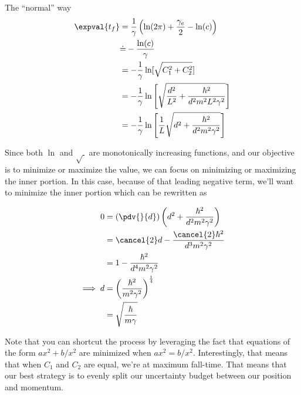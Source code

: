 \begin{answer}
\begin{answerpart}{The ``normal'' way}
    \begin{equation}
      \begin{split}
        \expval{t_f}
        &=
        \frac{1}{\gamma}
        \left(
        \ln(2\pi)
        +
        \frac{\gamma_e}{2}
        -
        \ln(c)
        \right)
        \\
        &\dot{=}
        -\frac{\ln(c)}{\gamma}
        \\
        &=
        -\frac{1}{\gamma}
        \ln[\sqrt{C_1^2 + C_2^2}]
        \\
        &=
        -\frac{1}{\gamma}
        \ln\left[\sqrt{\frac{d^2}{L^2} + \frac{\hbar^2}{d^2m^2L^2\gamma^2}}\right]
        \\
        &=
        -\frac{1}{\gamma}
        \ln\left[\frac{1}{L}\sqrt{d^2 + \frac{\hbar^2}{d^2m^2\gamma^2}}\right]
        \\
      \end{split}
    \end{equation}

    Since both $\ln$ and $\sqrt{\ }$ are monotonically increasing
    functions, and our objective is to minimize or maximize the value,
    we can focus on minimizing or maximizing the inner portion.  In
    this case, because of that leading negative term, we'll want to
    minimize the inner portion which can be rewritten as

    \begin{equation}
      \begin{alignedat}{2}
        &&0
        &= \left(\pdv{}{d}\right)
        \left(d^2 + \frac{\hbar^2}{d^2m^2\gamma^2}\right)
        \\
        &&&=
        \cancel{2}d - \frac{\cancel{2}\hbar^2}{d^3m^2\gamma^2}
        \\
        &&&=
        1 - \frac{\hbar^2}{d^4m^2\gamma^2}
        \\
        \implies{}&&
        d &=
        \left(
        \frac{\hbar^2}{m^2\gamma^2}
        \right)^\frac{1}{4}
        \\
        &&&=
        \sqrt{
          \frac{\hbar}{m\gamma}
        }
        \\
      \end{alignedat}
    \end{equation}

    Note that you can shortcut the process by leveraging the fact that
    equations of the form $ax^2 + b/x^2$ are minimized when $ax^2 =
    b/x^2$.  Interestingly, that means that when $C_1$ and $C_2$ are
    equal, we're at maximum fall-time.  That means that our best
    strategy is to evenly split our uncertainty budget between our
    position and momentum.


\end{answerpart}
\end{answer}
